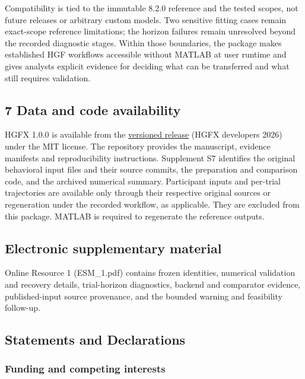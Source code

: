 \documentclass[
  11pt,
]{article}
\begin{document}
Compatibility is tied to the immutable 8.2.0 reference and the tested
scopes, not future releases or arbitrary custom models. Two sensitive
fitting cases remain exact-scope reference limitations; the horizon
failures remain unresolved beyond the recorded diagnostic stages. Within
those boundaries, the package makes established HGF workflows accessible
without MATLAB at user runtime and gives analysts explicit evidence for
deciding what can be transferred and what still requires validation.

\subsection{7 Data and code
availability}\label{data-and-code-availability}

HGFX 1.0.0 is available from the
\href{https://github.com/ahmadkhanloo/hgfx/releases/tag/v1.0.0}{versioned
release} (HGFX developers 2026) under the MIT license. The repository
provides the manuscript, evidence manifests and reproducibility
instructions. Supplement S7 identifies the original behavioral input
files and their source commits, the preparation and comparison code, and
the archived numerical summary. Participant inputs and per-trial
trajectories are available only through their respective original
sources or regeneration under the recorded workflow, as applicable. They
are excluded from this package. MATLAB is required to regenerate the
reference outputs.

\subsection{Electronic supplementary material}

Online Resource 1 (ESM\_1.pdf) contains frozen identities, numerical validation and recovery details, trial-horizon diagnostics, backend and comparator evidence, published-input source provenance, and the bounded warning and feasibility follow-up.

\subsection{Statements and
Declarations}\label{statements-and-declarations}

\subsubsection{Funding and competing
interests}\label{funding-and-competing-interests}
\end{document}

